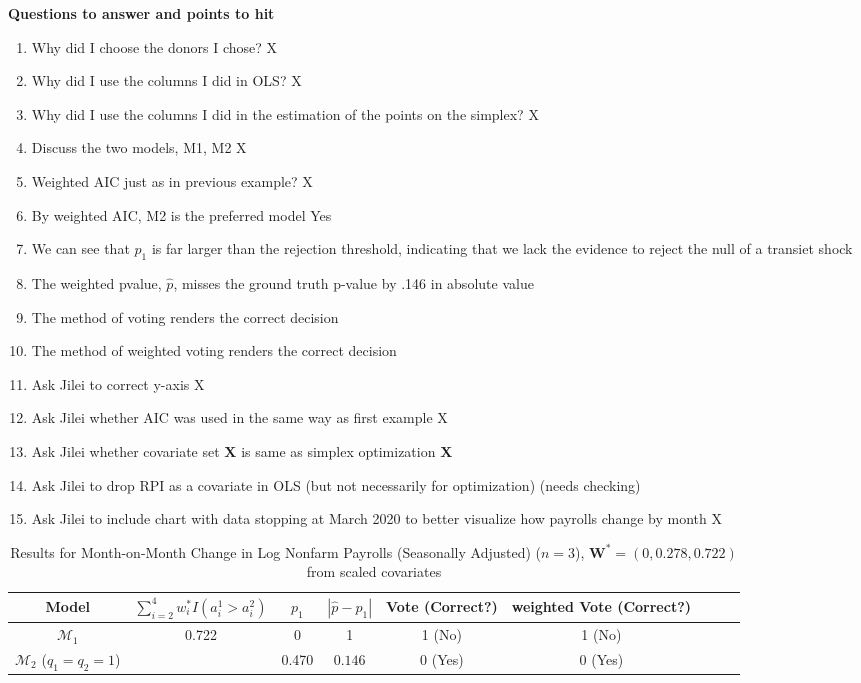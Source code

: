 \documentclass[11pt]{article}
\def\mbf#1{\mathbf{#1}} %
\def\mc#1{\mathcal{#1}} %
\def\mc#1{\mathcal{#1}}
\theoremstyle{definition}
\begin{document}
\textbf{Questions to answer and points to hit}
\begin{enumerate}
\item Why did I choose the donors I chose? X 
\item Why did I use the columns I did in OLS? X
\item Why did I use the columns I did in the estimation of the points on the simplex? X
\item Discuss the two models, M1, M2 X
\item Weighted AIC just as in previous example?  X
\item By weighted AIC, M2 is the preferred model Yes
\item We can see that $p_{1}$ is far larger than the rejection threshold, indicating that we lack the evidence to reject the null of a transiet shock
\item The weighted pvalue, $\hat p $, misses the ground truth p-value by .146 in absolute value
\item The method of voting renders the correct decision
\item The method of weighted voting renders the correct decision
\item Ask Jilei to correct y-axis X
\item Ask Jilei whether AIC was used in the same way as first example X
\item Ask Jilei whether covariate set $\textbf{X}$ is same as simplex optimization $\textbf{X}$ 
\item Ask Jilei to drop RPI as a covariate in OLS (but not necessarily for optimization) (needs checking)
\item Ask Jilei to include chart with data stopping at March 2020 to better visualize how payrolls change by month X

\end{enumerate}

\begin{table}[H]
	\caption{Results for Month-on-Month Change in Log Nonfarm Payrolls (Seasonally Adjusted) ($n=3$), $\mbf{W}^* = (0, 0.278, 0.722)$ from scaled covariates} \label{uemtable}
\begin{center}
  \begin{tabular}{ccccccccr}
      Model & $\sum_{i=2}^4 w_i^* I(a_i^1 > a_i^2)$  & $p_1$ &  $|\hat{p}-p_1|$ & Vote (Correct?) & weighted Vote (Correct?)   \\
     \hline 
     $\mc{M}_1$  & \multirow{2}{*}{0.722}& 0  & 1 & 1 (No) &1 (No)  \\      
      $\mc{M}_2$ ($q_1=q_2=1$)  & & 0.470 & $0.146$   & 0 (Yes) &0 (Yes)   \\[.2cm]
  \end{tabular}
\end{center}	
\end{table}
\end{document}
